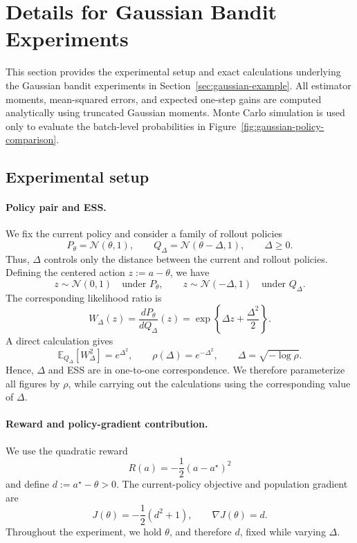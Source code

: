 \documentclass[11pt]{article}
\theoremstyle{remark}
\newcommand{\E}{\mathbb{E}}
\begin{document}





\appendix

\section{Details for Gaussian Bandit Experiments}
\label{app:gaussian}

This section provides the experimental setup and exact calculations underlying the Gaussian bandit experiments in Section~\ref{sec:gaussian-example}. All estimator moments, mean-squared errors, and expected one-step gains are computed analytically using truncated Gaussian moments. Monte Carlo simulation is used only to evaluate the batch-level probabilities in Figure~\ref{fig:gaussian-policy-comparison}.

\subsection{Experimental setup}

\paragraph{Policy pair and ESS.}
We fix the current policy and consider a family of rollout policies
\[
P_\theta=\mathcal N(\theta,1),
\qquad
Q_\Delta=\mathcal N(\theta-\Delta,1),
\qquad
\Delta\ge0.
\]
Thus, $\Delta$ controls only the distance between the current and rollout policies. Defining the centered action $z:=a-\theta$, we have
\[
z\sim\mathcal N(0,1) \quad\text{under }P_\theta,
\qquad
z\sim\mathcal N(-\Delta,1) \quad\text{under }Q_\Delta.
\]
The corresponding likelihood ratio is
\[
W_\Delta(z)
=
\frac{dP_\theta}{dQ_\Delta}(z)
=
\exp\!\left\{\Delta z+\frac{\Delta^2}{2}\right\}.
\]
A direct calculation gives
\begin{equation}
\E_{Q_\Delta}[W_\Delta^2]=e^{\Delta^2},
\qquad
\rho(\Delta)=e^{-\Delta^2},
\qquad
\Delta=\sqrt{-\log\rho}.
\label{eq:gaussian-ratio-ess}
\end{equation}
Hence, $\Delta$ and ESS are in one-to-one correspondence. We therefore parameterize all figures by $\rho$, while carrying out the calculations using the corresponding value of $\Delta$.

\paragraph{Reward and policy-gradient contribution.}
We use the quadratic reward
\[
R(a)=-\frac12(a-a^\star)^2
\]
and define $d:=a^\star-\theta>0$. The current-policy objective and population gradient are
\[
J(\theta)=-\frac12(d^2+1),
\qquad
\nabla J(\theta)=d.
\]
Throughout the experiment, we hold $\theta$, and therefore $d$, fixed while varying $\Delta$.
\end{document}
